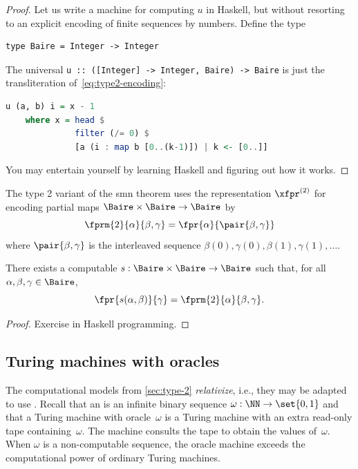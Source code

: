 \begin{proof}
  Let us write a machine for computing $u$ in Haskell, but without
  resorting to an explicit encoding of finite sequences by numbers.
  Define the type
\begin{lstlisting}
type Baire = Integer -> Integer
\end{lstlisting}
  The universal \lstinline!u :: ([Integer] -> Integer, Baire) -> Baire! %
  is just the transliteration of~\eqref{eq:type2-encoding}:
\begin{lstlisting}[language=Haskell]
u (a, b) i = x - 1
    where x = head $
              filter (/= 0) $
              [a (i : map b [0..(k-1)]) | k <- [0..]]
\end{lstlisting}
  You may entertain yourself by learning Haskell and figuring out how
  it works.
\end{proof}

The type 2 variant of the smn theorem uses the representation
$\xfpr^{(2)}$ for encoding partial maps $\Baire \times \Baire \to
\Baire$ by
%
\begin{equation*}
  \fprm{2}{\alpha}{\beta, \gamma} = \fpr{\alpha}{\pair{\beta, \gamma}}
\end{equation*}
%
where $\pair{\beta, \gamma}$ is the interleaved sequence $\beta(0), \gamma(0), \beta(1), \gamma(1), \ldots$.

\begin{theorem}
  \label{th:type-2-smd}%
  There exists a computable $s : \Baire \times \Baire \to \Baire$ such
  that, for all $\alpha, \beta, \gamma \in \Baire$,
  \begin{equation*}
    \fpr{s(\alpha, \beta)}{\gamma} = \fprm{2}{\alpha}{\beta, \gamma}.
  \end{equation*}
\end{theorem}

\begin{proof}
  Exercise in Haskell programming.
\end{proof}

\subsection{Turing machines with oracles}
\label{sec:turing-machines-with}

The computational models from \ref{sec:type-2} \emph{relativize}, i.e.,
they may be adapted to use . Recall that an  is an infinite binary sequence $\omega : \NN \to \set{0, 1}$ and that a Turing machine with oracle~$\omega$ is a Turing machine with an extra read-only tape containing~$\omega$. The machine consults the tape to obtain the values of~$\omega$.
When $\omega$ is a non-computable sequence, the oracle machine exceeds the computational power of ordinary Turing machines.

